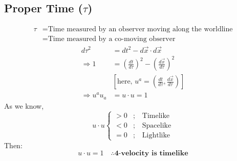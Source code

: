 \documentclass[14pt]{article} %
\begin{document}
\subsection*{Proper Time ($\tau$)}
\begin{align*}
    \tau &= \text{Time measured by an observer moving along the worldline} \\
    &= \text{Time measured by a co-moving observer}
\end{align*}
\begin{align*}
    d\tau^2 &= dt^2 - d\vec{x} \cdot d\vec{x} \\
    \Rightarrow 1 &= \left( \frac{dt}{d\tau} \right)^2 - \left( \frac{d\vec{x}}{d\tau} \right)^2 \\
   &\left[\text{here, } u^a = \left( \frac{dt}{d\tau}, \frac{d\vec{x}}{d\tau} \right)\right] \\
    \Rightarrow u^a u_a &= u \cdot u = 1
\end{align*}
As we know,
\[
\boxed{u \cdot u 
\begin{cases}
>0 & ;\quad  \text{Timelike} \\
<0 & ;\quad \text{Spacelike} \\
=0 & ;\quad \text{Lightlike}
\end{cases}}
\]
Then:
\[
u \cdot u = 1 \quad \therefore \textbf{4-velocity is timelike}
\]
\vspace{-1cm}
\end{document}

